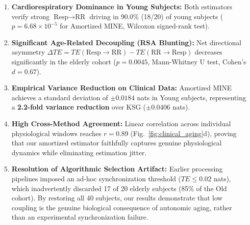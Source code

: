 \begin{enumerate}
    \item \textbf{Cardiorespiratory Dominance in Young Subjects:} Both estimators verify strong $\text{Resp} \to \text{RR}$ driving in 90.0\% (18/20) of young subjects ($p = 6.68 \times 10^{-5}$ for Amortized MINE, Wilcoxon signed-rank test).
    \item \textbf{Significant Age-Related Decoupling (RSA Blunting):} Net directional asymmetry $\Delta TE = TE(\text{Resp} \to \text{RR}) - TE(\text{RR} \to \text{Resp})$ decreases significantly in the elderly cohort ($p = 0.0045$, Mann-Whitney U test, Cohen's $d = 0.67$).
    \item \textbf{Empirical Variance Reduction on Clinical Data:} Amortized MINE achieves a standard deviation of $\pm 0.0184$ nats in Young subjects, representing a \textbf{2.2-fold variance reduction} over KSG ($\pm 0.0406$ nats).
    \item \textbf{High Cross-Method Agreement:} Linear correlation across individual physiological windows reaches $r = 0.89$ (Fig.~\ref{fig:clinical_aging}d), proving that our amortized estimator faithfully captures genuine physiological dynamics while eliminating estimation jitter.
    \item \textbf{Resolution of Algorithmic Selection Artifact:} Earlier processing pipelines imposed an ad-hoc synchronization threshold ($TE \le 0.02$ nats), which inadvertently discarded 17 of 20 elderly subjects (85\% of the Old cohort). By restoring all 40 subjects, our results demonstrate that low coupling is the genuine biological consequence of autonomic aging, rather than an experimental synchronization failure.
\end{enumerate}
